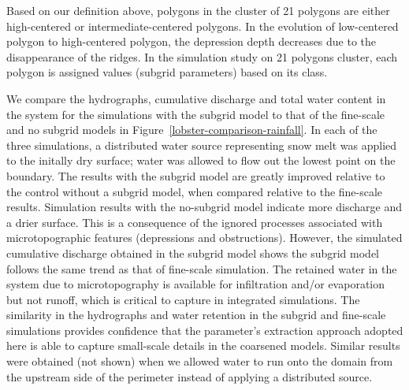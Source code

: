 \documentclass[review,11pt]{elsarticle}
\begin{document}
Based on our definition above, polygons in the cluster of 21 polygons are either high-centered or intermediate-centered polygons.
In the evolution of low-centered polygon to high-centered polygon, the depression depth decreases due to the disappearance of the ridges. In the simulation study on 21 polygons cluster, each polygon is assigned values (subgrid parameters) based on its class.

We compare the hydrographs, cumulative discharge and total water content in the system for the simulations with the subgrid model to that of the fine-scale and no subgrid models in Figure~\ref{lobster-comparison-rainfall}. In each of the three simulations, a distributed water source representing snow melt was applied to the initally dry surface; water was allowed to flow out the lowest point on the boundary. 
The results with the subgrid model are greatly improved relative to the control without a subgrid model, when compared relative to the fine-scale results.
Simulation results with the no-subgrid model indicate more discharge and a drier surface.
This is a consequence of the ignored processes associated with microtopographic features (depressions and obstructions).
However, the simulated cumulative discharge obtained in the subgrid model shows the subgrid model follows the same trend as that of fine-scale simulation.
The retained water in the system due to microtopography is available for infiltration and/or evaporation but not runoff, which is critical to capture in integrated simulations.
The similarity in the hydrographs and water retention in the subgrid and fine-scale simulations provides confidence that the parameter's extraction approach adopted here is able to capture small-scale details in the coarsened models. Similar results were obtained (not shown) when we allowed water to run onto the domain from the upstream side of the perimeter instead of applying a distributed source.  
\end{document}
